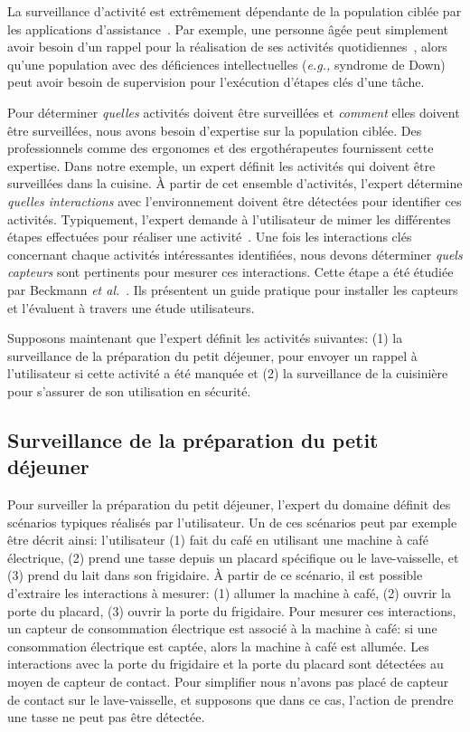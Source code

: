 La surveillance d'activité est extrêmement dépendante de la population ciblée par les applications d'assistance~\cite{DURICK-DISPELLING-OZCHI2013}. Par exemple, une personne âgée peut simplement avoir besoin d'un rappel pour la réalisation de ses activités quotidiennes~\cite{CAROUX-VERIFICATION-SIGACCESS2014}, alors qu'une population avec des déficiences intellectuelles ({\em e.g.,} syndrome de Down) peut avoir besoin de supervision pour l'exécution d'étapes clés d'une tâche\cite{LUSSIERDESROCHERS-ANALYSIS-DISABILITY2016}.

Pour déterminer {\em quelles} activités doivent être surveillées et {\em comment} elles doivent être surveillées, nous avons besoin d'expertise sur la population ciblée. Des professionnels comme des ergonomes et des ergothérapeutes fournissent cette expertise. Dans notre exemple, un expert définit les activités qui doivent être surveillées dans la cuisine. À partir de cet ensemble d'activités, l'expert détermine {\em quelles interactions} avec l'environnement doivent être détectées pour identifier ces activités. Typiquement, l'expert demande à l'utilisateur de mimer les différentes étapes effectuées pour réaliser une activité~\cite{CAROUX-VERIFICATION-SIGACCESS2014}. Une fois les interactions clés concernant chaque activités intéressantes identifiées, nous devons déterminer {\em quels capteurs} sont pertinents pour mesurer ces interactions. Cette étape a été étudiée par Beckmann {\em et al.}~\cite{BECKMANN-SOME-UBICOMP2004}. Ils présentent un guide pratique pour installer les capteurs et l'évaluent à travers une étude utilisateurs.

Supposons maintenant que l'expert définit les activités suivantes: (1) la surveillance de la préparation du petit déjeuner, pour envoyer un rappel à l'utilisateur si cette activité a été manquée et (2) la surveillance de la cuisinière pour s'assurer de son utilisation en sécurité.

\subsection{Surveillance de la préparation du petit déjeuner}
Pour surveiller la préparation du petit déjeuner, l'expert du domaine définit des scénarios typiques réalisés par l'utilisateur. 
Un de ces scénarios peut par exemple être décrit ainsi: l'utilisateur (1) fait du café en utilisant une machine à café électrique, (2) prend une tasse depuis un placard spécifique ou le lave-vaisselle, et (3) prend du lait dans son frigidaire. 
À partir de ce scénario, il est possible d'extraire les interactions à mesurer: (1) allumer la machine à café, (2) ouvrir la porte du placard, (3) ouvrir la porte du frigidaire. Pour mesurer ces interactions, un capteur de consommation électrique est associé à la machine à café: si une consommation électrique est captée, alors la machine à café est allumée. Les interactions avec la porte du frigidaire et la porte du placard sont détectées au moyen de capteur de contact. Pour simplifier nous n'avons pas placé de capteur de contact sur le lave-vaisselle, et supposons que dans ce cas, l'action de prendre une tasse ne peut pas être détectée.

